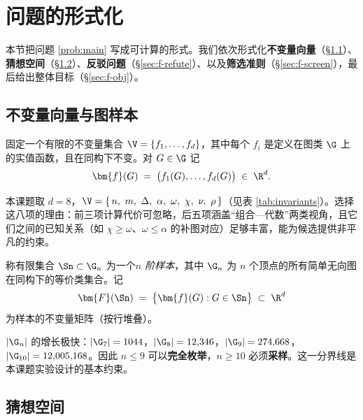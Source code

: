 \section{问题的形式化}
\label{sec:formulation}

本节把问题 \ref{prob:main} 写成可计算的形式。我们依次形式化\textbf{不变量向量}（\S\ref{sec:f-inv}）、\textbf{猜想空间}（\S\ref{sec:f-space}）、\textbf{反驳问题}（\S\ref{sec:f-refute}）、以及\textbf{筛选准则}（\S\ref{sec:f-screen}），最后给出整体目标（\S\ref{sec:f-obj}）。

\subsection{不变量向量与图样本}
\label{sec:f-inv}

固定一个有限的不变量集合 $\V=\{f_1,\dots,f_d\}$，其中每个 $f_i$ 是定义在图类 $\G$ 上的实值函数，且在同构下不变。对 $G\in\G$ 记
\begin{equation}
  \bm{f}(G) \;=\; \bigl(f_1(G),\dots,f_d(G)\bigr)\;\in\;\R^{d}.
  \label{eq:fvec}
\end{equation}

本课题取 $d=8$，$\V=\{\,n,\ m,\ \Delta,\ \alpha,\ \omega,\ \chi,\ \nu,\ \rho\,\}$（见表 \ref{tab:invariants}）。选择这八项的理由：前三项计算代价可忽略，后五项涵盖“组合—代数”两类视角，且它们之间的已知关系（如 $\chi\ge\omega$、$\omega\le\alpha$ 的补图对应）足够丰富，能为候选提供非平凡的约束。

\begin{definition}[图样本]
\label{def:sample}
称有限集合 $\Sn\subset\G_n$ 为一个\emph{$n$ 阶样本}，其中 $\G_n$ 为 $n$ 个顶点的所有简单无向图在同构下的等价类集合。记
\begin{equation}
  \bm{F}(\Sn) \;=\; \bigl\{\bm{f}(G) : G\in\Sn\bigr\}\;\subset\;\R^{d}
  \label{eq:sample}
\end{equation}
为样本的不变量矩阵（按行堆叠）。
\end{definition}

$|\G_n|$ 的增长极快：$|\G_7|=1044$，$|\G_8|=12{,}346$，$|\G_9|=274{,}668$，$|\G_{10}|=12{,}005{,}168$。因此 $n\le 9$ 可以\textbf{完全枚举}，$n\ge 10$ 必须\textbf{采样}。这一分界线是本课题实验设计的基本约束。

\subsection{猜想空间}
\label{sec:f-space}

